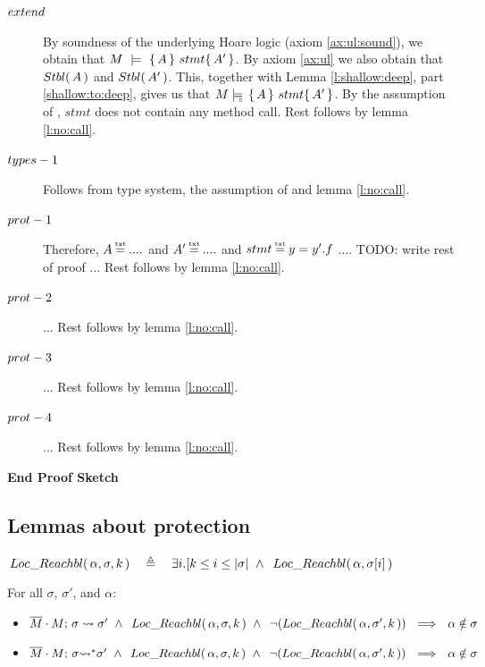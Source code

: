 \begin{description} 

\item[${\sc{extend}}$] 
By  soundness of the underlying Hoare logic (axiom \ref{ax:ul:sound}), we obtain that  $M\ \models\  \{\, A \, \}\ stmt \{\, A' \, \}$.
By axiom \ref{ax:ul} we also obtain that ${Stbl(\, A\, )}$ and  ${Stbl(\, A'\, )}$. 
This, together with   Lemma \ref{l:shallow:deep}, part \ref{shallow:to:deep}, gives us that
$M \models\!\!\!\!_{_{\circ}}\   \{\, A \, \}\ stmt \{\, A' \, \}  $. 
By the assumption of {}, $stmt$ does not contain any method call. Rest follows by lemma \ref{l:no:call}.

\item[${\sc{types-1}}$] 

Follows from type system, the assumption of {} and lemma \ref{l:no:call}.

\item[${\sc{prot-1}}$]  
Therefore, $A \txteq ....$ and $A' \txteq ....$  and $stmt \txteq y=y'.f$ .... TODO: write rest of proof ...
Rest follows by lemma \ref{l:no:call}.
\item[${\sc{prot-2}}$] ... Rest follows by lemma \ref{l:no:call}.

\item[${\sc{prot-3}}$] ... Rest follows by lemma \ref{l:no:call}.

\item[${\sc{prot-4}}$] ... Rest follows by lemma \ref{l:no:call}.

\end{description}
\noindent
\vspace{.1cm}
{\textbf{End Proof Sketch}} 

\subsection{Lemmas about protection}

\begin{definition}

$\LRelevantK {\alpha} {\sigma} {k}\ \ \ \triangleq\ \ \  \exists i.[ k \leq i \leq \depth \sigma \ \wedge \ \LRelevant {\alpha} {\RestictTo \sigma i}$
\end{definition}
 

{
\begin{lemma} For all $\sigma$, $\sigma'$, and $\alpha$:
\begin{itemize}
\item
$\leadstoBounded  {\Mtwo\cdot M}  {\sigma}  {\sigma'}\ \wedge \ \LRelevantK {\alpha} {\sigma} {k}\ \wedge\  \NotLRelevantK {\alpha} {\sigma'} {k} \ \ \Longrightarrow\ \ \alpha\notin\sigma$
\item
$\leadstoBoundedStar  {\Mtwo\cdot M}  {\sigma}  {\sigma'}\ \wedge \ \LRelevantK {\alpha} {\sigma} {k}\ \wedge \  \NotLRelevantK {\alpha} {\sigma'} {k} \ \  \Longrightarrow\ \ \alpha\notin\sigma$
\end{itemize}
\end{lemma}
 }
 

